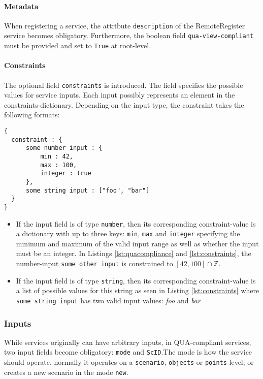 \paragraph{Metadata}
When registering a service, the attribute \texttt{description} of the RemoteRegister service becomes obligatory. Furthermore, the boolean field \texttt{qua-view-compliant} must be provided and set to \texttt{True} at root-level.

\paragraph{Constraints}
The optional field \texttt{constraints} is introduced. The field specifies the possible values for service inputs. Each input possibly represents an element in the constraints-dictionary. Depending on the input type, the constraint takes the following formats:

\begin{lstlisting}[caption={A string constraint}, label={lst:constraints}]
{
  constraint : {
      some number input : {
          min : 42,
          max : 100,
          integer : true
      },
      some string input : ["foo", "bar"]
  }
}
\end{lstlisting}


\begin{itemize}
	\item If the input field is of type \texttt{number}, then its corresponding constraint-value is a dictionary with up to three keys: \texttt{min}, \texttt{max} and \texttt{integer} specifying the minimum and maximum of the valid input range as well as whether the input must be an integer. In Listings \ref{lst:quacompliance} and \ref{lst:constraints}, the number-input \texttt{some other input} is constrained to $[42,100] \cap \mathbb{Z}$.
	\item If the input field is of type \texttt{string}, then its corresponding constraint-value is a list of possible values for this string as seen in Listing \ref{lst:constraints} where \texttt{some string input} has two valid input values: \emph{foo} and \emph{bar}
\end{itemize}

\subsubsection{Inputs}
While services originally can have arbitrary inputs, in QUA-compliant services, two input fields become obligatory: \texttt{mode} and \texttt{ScID}.The mode is how the service should operate, normally it operates on a \texttt{scenario}, \texttt{objects} or \texttt{points} level; or creates a new scenario in the mode \texttt{new}.

